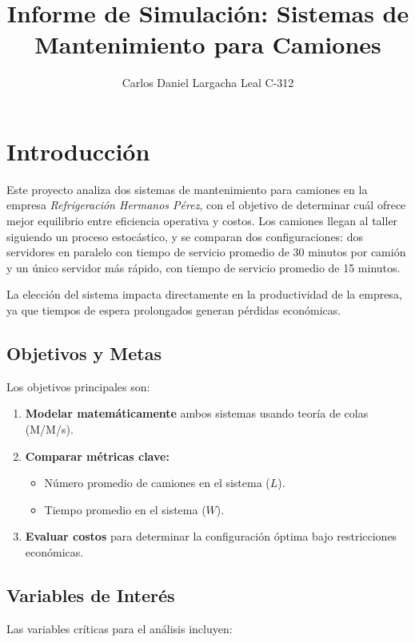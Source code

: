 \documentclass[12pt, a4paper]{article}
\title{Informe de Simulación: Sistemas de Mantenimiento para Camiones}
\author{Carlos Daniel Largacha Leal C-312}
\date{}
\begin{document}
	\maketitle
	
	\section{Introducción}

	Este proyecto analiza dos sistemas de mantenimiento para camiones en la empresa \textit{Refrigeración Hermanos Pérez}, con el objetivo de determinar cuál ofrece mejor equilibrio entre eficiencia operativa y costos. Los camiones llegan al taller siguiendo un proceso estocástico, y se comparan dos configuraciones: dos servidores en paralelo con tiempo de servicio promedio de 30 minutos por camión y un único servidor más rápido, con tiempo de servicio promedio de 15 minutos.
	
	La elección del sistema impacta directamente en la productividad de la empresa, ya que tiempos de espera prolongados generan pérdidas económicas.
	
	\subsection{Objetivos y Metas}
	Los objetivos principales son:
	
	\begin{enumerate}
		\item \textbf{Modelar matemáticamente} ambos sistemas usando teoría de colas (M/M/s).
		\item \textbf{Comparar métricas clave:} 
		\begin{itemize}
			\item Número promedio de camiones en el sistema ($L$).
			\item Tiempo promedio en el sistema ($W$).
		\end{itemize}
		\item \textbf{Evaluar costos} para determinar la configuración óptima bajo restricciones económicas.
	\end{enumerate}
	
	\subsection{Variables de Interés}
	Las variables críticas para el análisis incluyen:
	
\end{document}
